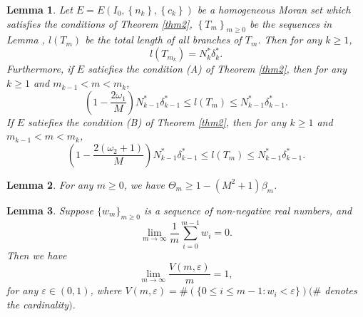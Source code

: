 \documentclass[10pt,a4paper]{amsart}
\newtheorem{lem}{Lemma}
\begin{document}
\begin{lem}\label{l7}
	Let $E=E(I_{0},\left\{n_{k}\right\},\left\{c_{k}\right\})$ be a homogeneous Moran set which satisfies the conditions of Theorem \ref{thm2}, $\left\{T_{m}\right\}_{m\ge0}$ be the sequences in Lemma \text{\rm\ref{l6}},
$l(T_{m})$ be the total length of all branches of $T_{m}$.
Then for any $k\ge 1$,
\begin{equation}
l(T_{m_{k}})=N^*_k\delta^*_k.
\end{equation}
Furthermore, if $E$ satiefies the condition {\rm(A)} of Theorem {\rm\ref{thm2}}, then for any $k\ge 1$ and $m_{k-1}<m<m_k$,
\begin{equation}
(1-\frac{2\omega_1}{M})N^*_{k-1}\delta^*_{k-1}\le l(T_m) \le N^*_{k-1}\delta^*_{k-1}.
\end{equation}
If $E$ satiefies the condition {\rm(B)} of Theorem {\rm\ref{thm2}}, then for any $k\ge 1$ and $m_{k-1}<m<m_k$,
\begin{equation}
(1-\frac{2(\omega_2+1)}{M})N^*_{k-1}\delta^*_{k-1}\le l(T_m) \le N^*_{k-1}\delta^*_{k-1}.
\end{equation}

\end{lem}

\begin{lem}\label{l8}
For any $m\ge0$, we have $\Theta_m\ge 1-(M^2+1)\beta_m$.
\end{lem}

\begin{lem}\label{l9}
Suppose $\{w_m\}_{m\ge 0}$ is a sequence of non-negative real numbers, and
\begin{equation*}
\lim_{m \to \infty} \frac{1}{m} \sum_{i=0}^{m-1} w_i=0.
\end{equation*}
Then we have
\begin{equation*}
\lim_{m \to \infty} \frac{V(m,\varepsilon )}{m} =1,
 \end{equation*}
for any $\varepsilon\in (0,1)$, where $V(m,\varepsilon )=\#(\{0\le i\le m-1: w_i<\varepsilon\})$$(\#$ denotes the cardinality$)$.
\end{lem}
\end{document}
